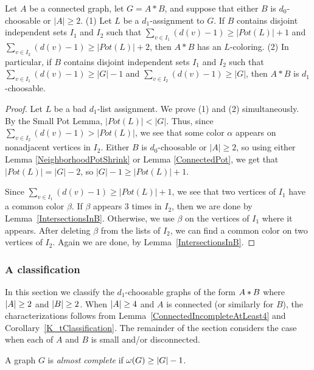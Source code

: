 \begin{lem}\label{ind-sets}
Let $A$ be a connected graph, let $G=A*B$, and suppose that either $B$ is
$d_0$-choosable or $|A|\ge 2$.
(1) Let $L$ be a $d_1$-assignment to $G$.
If $B$ contains disjoint independent sets $I_1$ and $I_2$ such that
$\sum_{v\in I_1}(d(v)-1)\ge |Pot(L)|+1$ and $\sum_{v\in I_2}(d(v)-1)\ge
|Pot(L)|+2$, then $A*B$ has an $L$-coloring.
(2) In particular, if $B$ contains disjoint independent sets $I_1$ and $I_2$
such that $\sum_{v\in I_1}(d(v)-1)\ge |G|-1$ and $\sum_{v\in I_2}(d(v)-1)\ge
|G|$, then $A*B$ is $d_1$-choosable.
\end{lem}
\begin{proof}
Let $L$ be a bad $d_1$-list assignment.
We prove (1) and (2) simultaneously.
By the Small Pot Lemma, $|Pot(L)|<|G|$.  Thus, since $\sum_{v\in I_2}(d(v)-1)>
|Pot(L)|$, we
see that some color $\alpha$ appears on nonadjacent vertices in $I_2$.  Either
$B$ is $d_0$-choosable or $|A|\ge 2$, so using either Lemma
\ref{NeighborhoodPotShrink} or Lemma \ref{ConnectedPot}, we get that
$|Pot(L)|=|G|-2$, so $|G|-1\ge |Pot(L)|+1$.

Since $\sum_{v\in I_1}(d(v)-1)\ge |Pot(L)|+1$, we see that two vertices of
$I_1$ have a common color $\beta$.  If $\beta$ appears 3 times in $I_2$, then
we are done by Lemma~\ref{IntersectionsInB}.  Otherwise, we use $\beta$ on the
vertices of $I_1$ where it appears.
After deleting $\beta$ from the lists of $I_2$, we can find a common
color on two vertices of $I_2$. Again we are done, by
Lemma~\ref{IntersectionsInB}.
\end{proof}

\subsubsection{A classification}
In this section we classify the $d_1$-choosable graphs of the form $A \mbox{\hspace{2 pt}$\ast$\hspace{2 pt}} B$ where $\left|A\right| \geq 2$ and $\left|B\right| \geq 2$.
When $\left|A\right|\ge 4$ and $A$ is connected (or similarly for $B$), the
characterizations follows from Lemma~\ref{ConnectedIncompleteAtLeast4} and
Corollary~\ref{K_tClassification}.  The remainder of the section considers the
case when each of $A$ and $B$ is small and/or disconnected.

\begin{defn}
A graph $G$ is \emph{almost complete} if $\omega(G) \geq \left|G\right| - 1$.
\end{defn}

